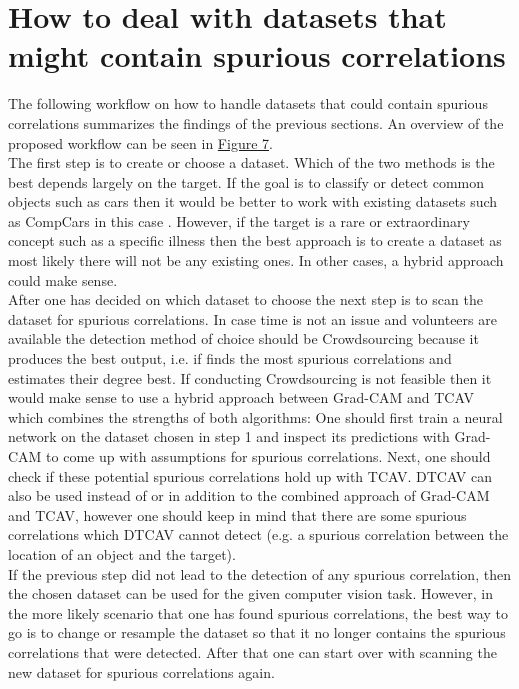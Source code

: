 \documentclass{article}
\begin{document}
\section{How to deal with datasets that might contain spurious correlations}
The following workflow on how to handle datasets that could contain spurious correlations summarizes the findings of the previous sections.
An overview of the proposed workflow can be seen in \hyperref[fig:workflow]{Figure 7}. \\
The first step is to create or choose a dataset. Which of the two methods is the best depends largely on the target. If the goal is to classify or
detect common objects such as cars then it would be better to work with existing datasets such as CompCars in this case \cite{Yang_2015_CVPR}.
However, if the target is a rare or extraordinary concept such as a specific illness then the best approach is to create a dataset as most likely there will
not be any existing ones. In other cases, a hybrid approach could make sense. \\
After one has decided on which dataset to choose the next step is to scan the dataset for spurious correlations. In case time is not an issue
and volunteers are available the detection method of choice should be Crowdsourcing because it produces the best output, i.e. if finds the most spurious
correlations and estimates their degree best. If conducting Crowdsourcing is not feasible then it would make sense to use a hybrid approach between Grad-CAM and TCAV which
combines the strengths of both algorithms: One should first train a neural network on the dataset chosen in step 1 and inspect its predictions with Grad-CAM
to come up with assumptions for spurious correlations. Next, one should check if these potential spurious correlations hold up with TCAV. DTCAV can also be used 
instead of or in addition to the combined approach of Grad-CAM and TCAV, however one should keep in mind that there are some spurious correlations which DTCAV cannot detect
(e.g. a spurious correlation between the location of an object and the target). \\
If the previous step did not lead to the detection of any spurious correlation, then the chosen dataset can be used for the given computer vision task. 
However, in the more likely scenario that one has found spurious correlations, the best way to go is to change or resample the dataset so that it no longer
contains the spurious correlations that were detected. After that one can start over with scanning the new dataset for spurious correlations again. \\
\end{document}
